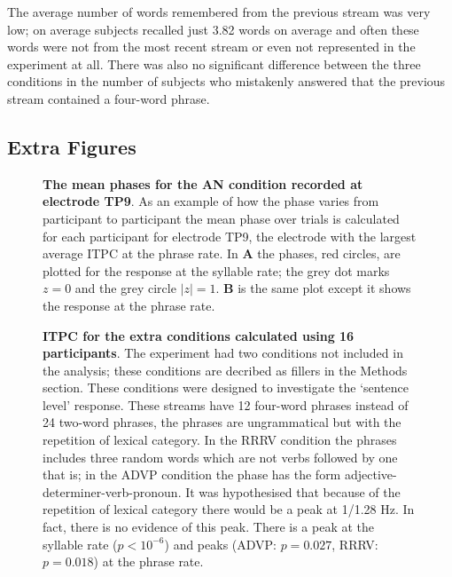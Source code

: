\documentclass[10pt,letterpaper]{article}
\begin{document}
The average number of words remembered from the previous stream was
very low; on average subjects recalled just 3.82 words on average and
often these words were not from the most recent stream or even not
represented in the experiment at all. There was also no significant
difference between the three conditions in the number of subjects who
mistakenly answered that the previous stream contained a four-word
phrase.

\newpage


\subsection*{Extra Figures}

 \begin{figure}[hp]

\caption{\textbf{The mean phases for the AN condition recorded at
    electrode TP9}. As an example of how the phase varies from
  participant to participant the mean phase over trials is calculated
  for each participant for electrode TP9, the electrode with the
  largest average ITPC at the phrase rate. In \textbf{A} the phases,
  red circles, are plotted for the response at the syllable rate; the
  grey dot marks $z=0$ and the grey circle $|z|=1$. \textbf{B} is the
  same plot except it shows the response at the phrase
  rate. \label{fig:phases}}
\end{figure}

 \begin{figure}[hp]

\caption{\textbf{ITPC for the extra conditions calculated using 16
    participants}. The experiment had two conditions not included in
  the analysis; these conditions are decribed as fillers in the
  Methods section. These conditions were designed to investigate the
  `sentence level' response. These streams have 12 four-word phrases
  instead of 24 two-word phrases, the phrases are ungrammatical but
  with the repetition of lexical category. In the RRRV condition the
  phrases includes three random words which are not verbs followed by
  one that is; in the ADVP condition the phase has the form
  adjective-determiner-verb-pronoun.  It was hypothesised that because
  of the repetition of lexical category there would be a peak at
  1/1.28 Hz. In fact, there is no evidence of this peak. There is a
  peak at the syllable rate ($p<10^{-6}$) and peaks (ADVP: $p=0.027$,
  RRRV: $p=0.018$) at the phrase rate.}
\label{fig:Fig1}
\end{figure}


 
\end{document}
